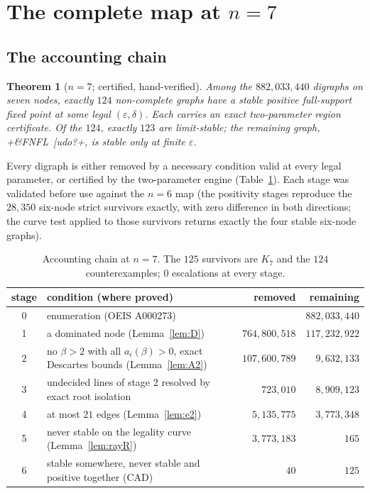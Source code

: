 \documentclass[11pt]{article}
\newtheorem{theorem}{Theorem}[section]
\theoremstyle{definition}
\newcommand{\eps}{\varepsilon}
\begin{document}
\section{The complete map at \texorpdfstring{$n=7$}{n = 7}}\label{sec:n7}

\subsection{The accounting chain}
\begin{theorem}[$n=7$; certified, hand-verified]\label{thm:n7}
Among the $882{,}033{,}440$ digraphs on seven nodes, exactly $124$ non-complete graphs have a stable positive full-support
fixed point at some legal $(\eps,\delta)$. Each carries an exact two-parameter region certificate. Of the $124$, exactly
$123$ are limit-stable; the remaining graph, \dsix+&FNFL~[udo?+, is stable only at finite $\eps$.
\end{theorem}

Every digraph is either removed by a necessary condition valid at every legal parameter, or certified by the
two-parameter engine (Table~\ref{tab:chain}). Each stage was validated before use against the $n=6$ map (the positivity
stages reproduce the $28{,}350$ six-node strict survivors exactly, with zero difference in both directions; the curve
test applied to those survivors returns exactly the four stable six-node graphs).

\begin{table}[ht]
\centering
\small
\begin{tabular}{@{}cp{}rr@{}}
\toprule
stage & condition (where proved) & removed & remaining\\
\midrule
0 & enumeration (OEIS A000273) & & $882{,}033{,}440$\\
1 & a dominated node (Lemma~\ref{lem:D}) & $764{,}800{,}518$ & $117{,}232{,}922$\\
2 & no $\beta>2$ with all $a_i(\beta)>0$, exact Descartes bounds (Lemma~\ref{lem:A2}) & $107{,}600{,}789$ & $9{,}632{,}133$\\
3 & undecided lines of stage 2 resolved by exact root isolation & $723{,}010$ & $8{,}909{,}123$\\
4 & at most $21$ edges (Lemma~\ref{lem:e2}) & $5{,}135{,}775$ & $3{,}773{,}348$\\
5 & never stable on the legality curve (Lemma~\ref{lem:rayR}) & $3{,}773{,}183$ & $165$\\
6 & stable somewhere, never stable and positive together (CAD) & $40$ & $125$\\
\bottomrule
\end{tabular}
\caption{Accounting chain at $n=7$. The $125$ survivors are $K_7$ and the $124$ counterexamples; $0$ escalations at every
stage.}\label{tab:chain}
\end{table}
\end{document}
